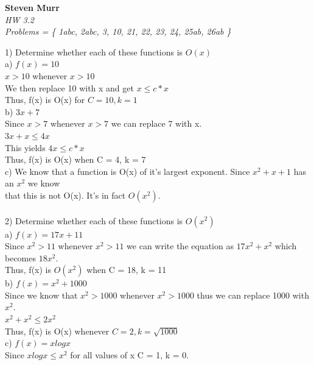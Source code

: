 \documentclass{article}
\begin{document}
\setcounter{totalnumber}{5}
   \begin{flushright}
      \Large\textbf{Steven Murr}\\
      \large\textit{HW 3.2}\\
      \large\textit{Problems = \{ 1abc, 2abc, 3, 10, 21, 22, 23, 24, 25ab, 26ab \}} \\
   \end{flushright}
\begin{flushleft}
\makeatletter%
\setlength{\@fptop}{5pt}
\makeatother
\setlength\parindent{0pt}1) Determine whether each of these functions is $O(x)$ \\
\setlength\parindent{24pt}a) $f(x) = 10$ \\
\setlength\parindent{48pt} $x > 10$ whenever $x > 10$\\
\setlength\parindent{48pt} We then replace 10 with x and get $x \leq c*x$ \\
\setlength\parindent{48pt} Thus, f(x) is O(x) for $C = 10, k = 1$\\
\setlength\parindent{24pt}b) $3x + 7$ \\
\setlength\parindent{48pt} Since $x > 7$ whenever $x > 7$ we can replace 7 with x. \\
\setlength\parindent{48pt} $3x + x \leq 4x$ \\
\setlength\parindent{48pt} This yields $4x \leq c*x$ \\
\setlength\parindent{48pt} Thus, f(x) is O(x) when C = 4, k = 7 \\
\setlength\parindent{24pt}c) We know that a function is O(x) of it's largest exponent.  Since $x^2 + x + 1$ has an $x^2$ we know \\that this is not O(x).  It's in fact $O(x^2)$. \\
~\\
\setlength\parindent{0pt}2) Determine whether each of these functions is $O(x^2)$ \\
\setlength\parindent{24pt}a) $f(x) = 17x + 11$ \\
\setlength\parindent{48pt} Since $x^2 > 11$ whenever $x^2 > 11$ we can write the equation as $17x^2 + x^2$ which becomes $18x^2$.  \\
\setlength\parindent{48pt} Thus, f(x) is $O(x^2)$ when C = 18, k = 11 \\
\setlength\parindent{24pt}b) $f(x) = x^2 + 1000$ \\
\setlength\parindent{48pt} Since we know that $x^2 > 1000$ whenever $x^2 > 1000$ thus we can replace 1000 with $x^2$.\\
\setlength\parindent{48pt} $x^2 + x^2 \leq 2x^2$\\
\setlength\parindent{48pt} Thus, f(x) is O(x) whenever $C = 2, k = \sqrt{1000}$ \\
\setlength\parindent{24pt}c) $f(x) = x logx$ \\
\setlength\parindent{48pt} Since $x log x \leq x^2$ for all values of x C = 1, k = 0.\\


\end{flushleft}
\end{document}
